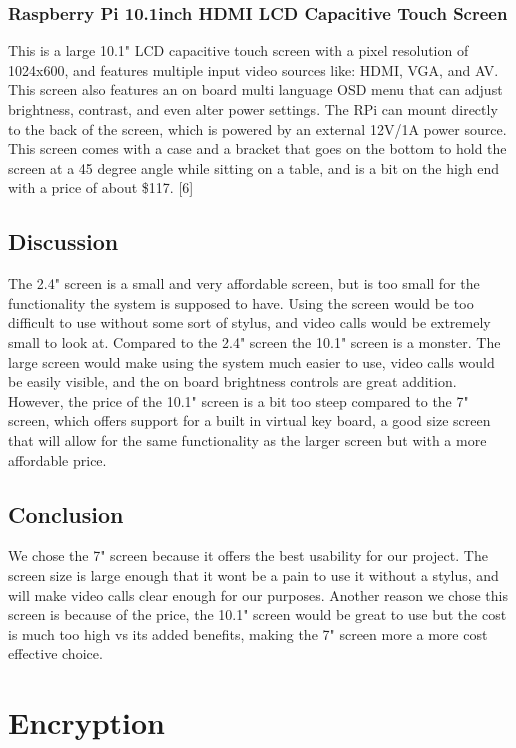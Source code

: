 \documentclass[onecolumn, draftclsnofoot,10pt, compsoc]{IEEEtran}
\begin{document}
\subsubsection{Raspberry Pi 10.1inch HDMI LCD Capacitive Touch Screen}
This is a large 10.1" LCD capacitive touch screen with a pixel resolution of 1024x600, and features multiple input video sources like: HDMI, VGA, and AV. This screen also features an on board multi language OSD menu that can adjust brightness, contrast, and even alter power settings. The RPi can mount directly to the back of the screen, which is powered by an external 12V/1A power source. This screen comes with a case and a bracket that goes on the bottom to hold the screen at a 45 degree angle while sitting on a table, and is a bit on the high end with a price of about \$117. [6]
 



\subsection{Discussion}
The 2.4" screen is a small and very affordable screen, but is too small for the functionality the system is supposed to have. Using the screen would be too difficult to use without some sort of stylus, and video calls would be extremely small to look at. Compared to the 2.4" screen the 10.1" screen is a monster. The large screen would make using the system much easier to use, video calls would be easily visible, and the on board brightness controls are great addition. However, the price of the 10.1" screen is a bit too steep compared to the 7" screen, which offers support for a built in virtual key board, a good size screen that will allow for the same functionality as the larger screen but with a more affordable price.

\subsection{Conclusion}
We chose the 7" screen because it offers the best usability for our project. The screen size is large enough that it wont be a pain to use it without a stylus, and will make video calls clear enough for our purposes. Another reason we chose this screen is because of the price, the 10.1" screen would be great to use but the cost is much too high vs its added benefits, making the 7" screen more a more cost effective choice.




\section{Encryption}
\end{document}
